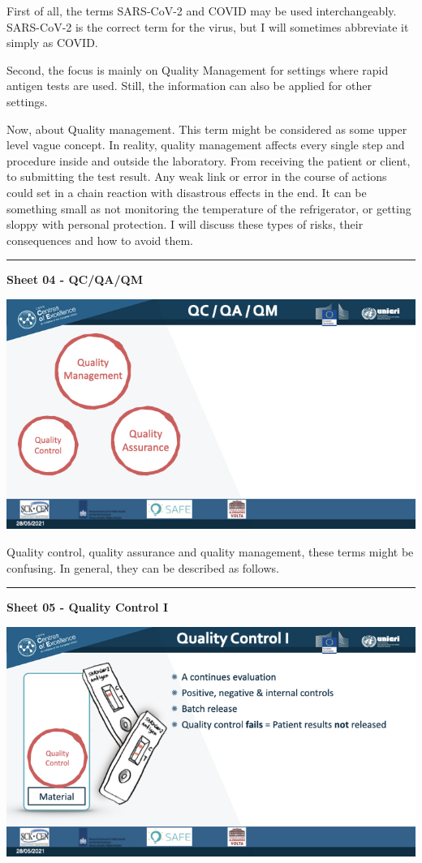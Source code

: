 \documentclass[
]{book}
\begin{document}
First of all, the terms SARS-CoV-2 and COVID may be used
interchangeably. SARS-CoV-2 is the correct term for the virus, but I
will sometimes abbreviate it simply as COVID.

Second, the focus is mainly on Quality Management for settings where
rapid antigen tests are used. Still, the information can also be applied
for other settings.

Now, about Quality management. This term might be considered as some
upper level vague concept. In reality, quality management affects every
single step and procedure inside and outside the laboratory. From
receiving the patient or client, to submitting the test result. Any weak
link or error in the course of actions could set in a chain reaction
with disastrous effects in the end. It can be something small as not
monitoring the temperature of the refrigerator, or getting sloppy with
personal protection. I will discuss these types of risks, their
consequences and how to avoid them.

\begin{center}\rule{0.5\linewidth}{0.5pt}\end{center}

\textbf{Sheet 04 - QC/QA/QM}

\includegraphics{images/m04/m04_Quality_management_v3.004.jpeg}

Quality control, quality assurance and quality management, these terms
might be confusing. In general, they can be described as follows.

\begin{center}\rule{0.5\linewidth}{0.5pt}\end{center}

\textbf{Sheet 05 - Quality Control I}

\includegraphics{images/m04/m04_Quality_management_v3.005.jpeg}
\end{document}
